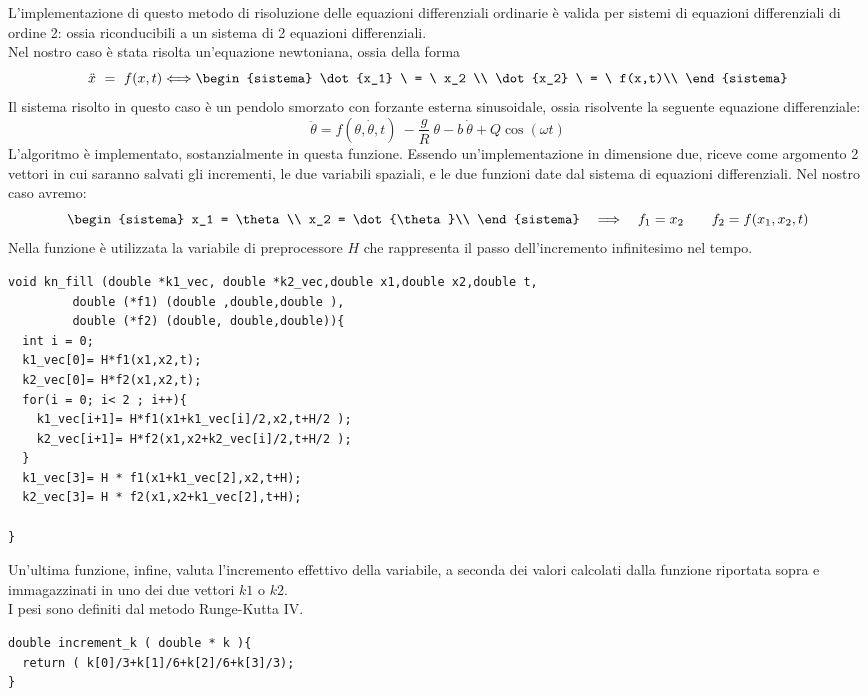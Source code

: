 L'implementazione di questo metodo di risoluzione delle equazioni differenziali ordinarie è valida
per sistemi di equazioni differenziali di ordine 2: ossia riconducibili a un sistema di 2 equazioni differenziali.\\
Nel nostro caso è stata risolta un'equazione newtoniana, ossia della forma
$$
	\ddot{x} \ = \ f(x,t) \Longleftrightarrow  
	\begin{sistema}
	\dot{x_1} \ = \ x_2 \\
	\dot{x_2} \ = \ f(x,t)\\
	\end{sistema}
$$
Il sistema risolto in questo caso è un pendolo smorzato con forzante esterna sinusoidale, ossia
risolvente la seguente equazione differenziale:
$$
	\ddot{\theta} = f(\theta,\dot{\theta},t) \ - \frac{g}{R} \ \theta - b \ \dot{\theta} + Q \cos ( \omega t )
$$
L'algoritmo è implementato, sostanzialmente in questa funzione. Essendo un'implementazione in dimensione due, riceve come argomento 2 vettori in cui saranno salvati gli incrementi, le due variabili spaziali, e le due funzioni date dal sistema di equazioni differenziali.
Nel nostro caso avremo:
$$
	\begin{sistema}
	x_1 = \theta\\
	x_2 = \dot{\theta}\\
	\end{sistema}
	\quad \Longrightarrow \quad f_1 = x_2  \qquad f_2 = f(x_1,x_2,t)	
$$
Nella funzione è utilizzata la variabile di preprocessore $H$ che rappresenta il passo dell'incremento
infinitesimo nel tempo.
\begin{verbatim}
void kn_fill (double *k1_vec, double *k2_vec,double x1,double x2,double t,
		 double (*f1) (double ,double,double ), 
		 double (*f2) (double, double,double)){
  int i = 0;
  k1_vec[0]= H*f1(x1,x2,t);
  k2_vec[0]= H*f2(x1,x2,t);
  for(i = 0; i< 2 ; i++){
    k1_vec[i+1]= H*f1(x1+k1_vec[i]/2,x2,t+H/2 ); 
    k2_vec[i+1]= H*f2(x1,x2+k2_vec[i]/2,t+H/2 ); 
  }
  k1_vec[3]= H * f1(x1+k1_vec[2],x2,t+H);
  k2_vec[3]= H * f2(x1,x2+k1_vec[2],t+H);

}
\end{verbatim}

Un'ultima funzione, infine, valuta l'incremento effettivo della variabile, a seconda dei valori calcolati
dalla funzione riportata sopra e immagazzinati in uno dei due vettori $k1$ o $k2$.\\
I pesi sono definiti dal metodo Runge-Kutta IV.
\begin{verbatim}
double increment_k ( double * k ){
  return ( k[0]/3+k[1]/6+k[2]/6+k[3]/3);
}
\end{verbatim}

